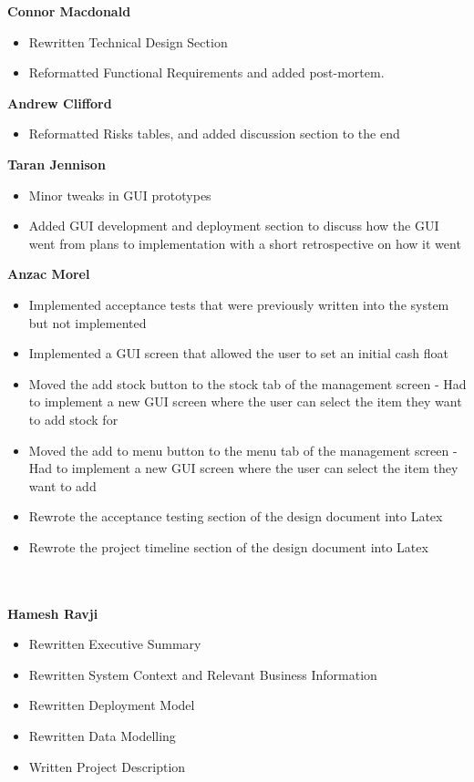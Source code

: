 
\textbf{Connor Macdonald}
\begin{itemize}
	\item Rewritten Technical Design Section
	\item Reformatted Functional Requirements and added post-mortem.
\end{itemize}

\textbf{Andrew Clifford}
\begin{itemize}
	\item Reformatted Risks tables, and added discussion section to the end
\end{itemize}

\textbf{Taran Jennison}
\begin{itemize}
	\item Minor tweaks in GUI prototypes
	\item Added GUI development and deployment section to discuss how the GUI went from plans to implementation with a short retrospective on how it went
\end{itemize}

\noindent\textbf{Anzac Morel}
\begin{itemize}
	\item Implemented acceptance tests that were previously written into the system but not implemented
	\item Implemented a GUI screen that allowed the user to set an initial cash float
	\item Moved the add stock button to the stock tab of the management screen - Had to implement a new GUI screen where the user can select the item they want to add stock for
	\item Moved the add to menu button to the menu tab of the management screen - Had to implement a new GUI screen where the user can select the item they want to add
	\item Rewrote the acceptance testing section of the design document into Latex
	\item Rewrote the project timeline section of the design document into Latex
\end{itemize}
\\ \\
\textbf{Hamesh Ravji}
\begin{itemize}
	\item Rewritten Executive Summary
	\item Rewritten System Context and Relevant Business Information
	\item Rewritten Deployment Model
	\item Rewritten Data Modelling
	\item Written Project Description
\end{itemize}